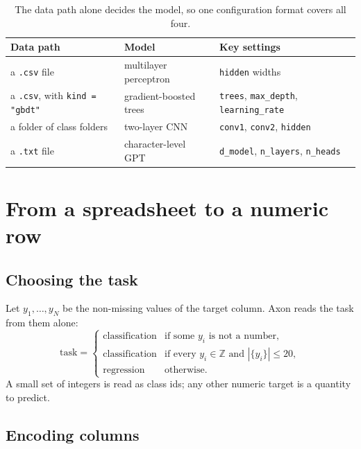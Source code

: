 \documentclass[11pt]{article}
\theoremstyle{plain}
\theoremstyle{definition}
\newcommand{\code}[1]{\texttt{#1}}
\newcommand{\abs}[1]{\left\lvert #1 \right\rvert}
\begin{document}
\begin{table}[htbp]
\centering
\caption{The data path alone decides the model, so one configuration format
covers all four.}
\label{tab:models}
\begin{tabular}{l l l}
\toprule
Data path & Model & Key settings \\
\midrule
a \code{.csv} file & multilayer perceptron & \code{hidden} widths \\
a \code{.csv}, with \code{kind = "gbdt"} & gradient-boosted trees & \code{trees}, \code{max\_depth}, \code{learning\_rate} \\
a folder of class folders & two-layer CNN & \code{conv1}, \code{conv2}, \code{hidden} \\
a \code{.txt} file & character-level GPT & \code{d\_model}, \code{n\_layers}, \code{n\_heads} \\
\bottomrule
\end{tabular}
\end{table}

\section{From a spreadsheet to a numeric row}\label{sec:encode}

\subsection{Choosing the task}

Let $y_1, \ldots, y_N$ be the non-missing values of the target column. Axon
reads the task from them alone:
\begin{equation}\label{eq:task}
  \text{task} =
  \begin{cases}
    \text{classification} & \text{if some } y_i \text{ is not a number,} \\
    \text{classification} & \text{if every } y_i \in \mathbb{Z} \text{ and } \abs{\{y_i\}} \le 20, \\
    \text{regression} & \text{otherwise.}
  \end{cases}
\end{equation}
A small set of integers is read as class ids; any other numeric target is a
quantity to predict.

\subsection{Encoding columns}
\end{document}
